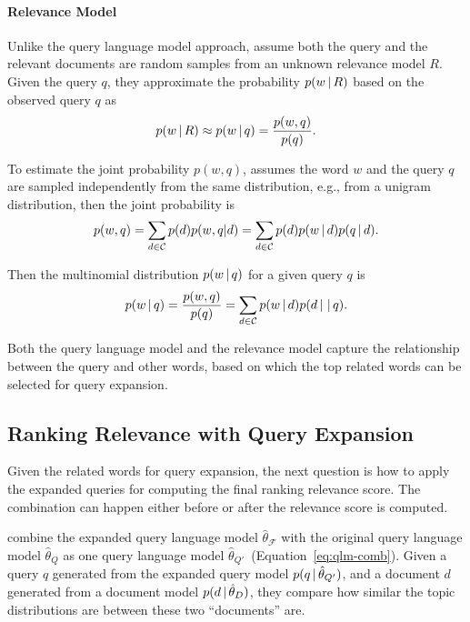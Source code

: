\paragraph{Relevance Model}

Unlike the query language model approach,
\citet{Lavrenko-2001} assume both the query and the relevant documents
are random samples from an unknown relevance model $R$. Given the
query $q$, they approximate the probability $p(w \, | \, R)$ based on the
observed query $q$ as 
\begin{align}
p(w \, | \, R) \approx p(w \, | \, q) = \frac{p(w,q)}{p(q)}.
\end{align}

To estimate the joint probability $p(w, q)$, \citet{Lavrenko-2001}
assumes the word $w$ and the query $q$ are sampled independently from
the same distribution, e.g., from a unigram distribution, then the
joint probability is
\begin{align}
p(w, q) = \sum_{d \in \mathcal{C}} p(d) p(w,q |d) = \sum_{d \in
  \mathcal{C}} p(d) p(w \, | \, d) p(q \, | \, d).
\end{align}

Then the multinomial distribution $p(w \, | \, q)$ for a given query $q$ is
\begin{align}
\label{eq:rm_qe}
p(w \, | \, q) = \frac{p(w, q)}{p(q)} = \sum_{d \in \mathcal{C}} p(w \, | \, d) p(d
  \, | \, \, | \, q).
\end{align}

Both the query language model and the relevance model capture the
relationship between the query and other words, based on which the top
related words can be selected for query expansion.

\subsection{Ranking Relevance with Query Expansion}

Given the related words for query expansion, the next question is how
to apply the expanded queries for computing the final ranking
relevance score. The combination can happen either before or after the
relevance score is computed.

\citet{zhai-01b} combine the expanded query language model
$\hat{\theta}_{\mathcal{F}}$ with the original query language model
$\hat{\theta}_{Q}$ as one query language model $\hat{\theta}_{Q'}
$~(Equation~\ref{eq:qlm-comb}). Given a query $q$ generated from the
expanded query model $p(q \, | \, \hat{\theta}_{Q'})$, and a document $d$
generated from a document model $p(d \, | \, \hat{\theta}_D)$, they compare
how similar the topic distributions are between these two
``documents'' are.

